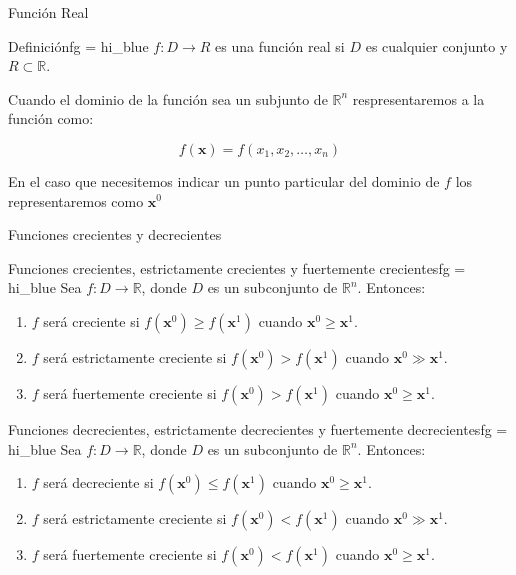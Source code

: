 \documentclass[10pt,aspectratio=169]{beamer}  %
\begin{document}
\begin{frame}{Función Real}
	
	\begin{varblock}{Definición}{fg = hi_blue}
	  $f: D \rightarrow R$ es una función real si $D$ es cualquier conjunto y $R \subset \mathbb{R}$.
	\end{varblock}
	\vspace{10pt}
	Cuando el dominio de la función sea un subjunto de $\mathbb{R}^{n}$ respresentaremos a la función como:
	
	\[f(\mathbf{x}) = f(x_1, x_2, \dots, x_n)\]

	En el caso que necesitemos indicar un punto particular del dominio de $f$ los representaremos como $\mathbf{x}^0$
\end{frame}

\begin{frame}{Funciones crecientes y decrecientes}
	\begin{varblock}{Funciones crecientes, estrictamente crecientes y fuertemente crecientes}{fg = hi_blue}
		Sea $f: D \rightarrow \mathbb{R}$, donde $D$ es un subconjunto de $\mathbb{R}^n$. Entonces:
	
		\begin{enumerate}[label=(\alph*)]
			\item $f$ será creciente si $f(\mathbf{x}^0) \geq f(\mathbf{x}^1)$ cuando $\mathbf{x}^0 \geq \mathbf{x}^1$.
			\item $f$ será estrictamente creciente si $f(\mathbf{x}^0) > f(\mathbf{x}^1)$ cuando $\mathbf{x}^0 \gg \mathbf{x}^1$.
			\item $f$ será fuertemente creciente si $f(\mathbf{x}^0) > f(\mathbf{x}^1)$ cuando $\mathbf{x}^0 \geq \mathbf{x}^1$.
		\end{enumerate}
	  
	\end{varblock}

	\begin{varblock}{Funciones decrecientes, estrictamente decrecientes y fuertemente decrecientes}{fg = hi_blue}
		Sea $f: D \rightarrow \mathbb{R}$, donde $D$ es un subconjunto de $\mathbb{R}^n$. Entonces:
	
		\begin{enumerate}[label=(\alph*)]
			\item $f$ será decreciente si $f(\mathbf{x}^0) \leq f(\mathbf{x}^1)$ cuando $\mathbf{x}^0 \geq \mathbf{x}^1$.
			\item $f$ será estrictamente creciente si $f(\mathbf{x}^0) < f(\mathbf{x}^1)$ cuando $\mathbf{x}^0 \gg \mathbf{x}^1$.
			\item $f$ será fuertemente creciente si $f(\mathbf{x}^0) < f(\mathbf{x}^1)$ cuando $\mathbf{x}^0 \geq \mathbf{x}^1$.
		\end{enumerate}
	  
	\end{varblock}
	

\end{frame}
\end{document}
